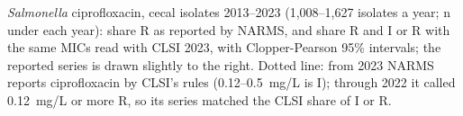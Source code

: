 \textit{Salmonella} ciprofloxacin, cecal isolates 2013--2023 (1,008--1,627 isolates a year; n under each year): share R as reported by NARMS, and share R and I or R with the same MICs read with CLSI 2023, with Clopper-Pearson 95\% intervals; the reported series is drawn slightly to the right. Dotted line: from 2023 NARMS reports ciprofloxacin by CLSI's rules (0.12--0.5~mg/L is I); through 2022 it called 0.12~mg/L or more R, so its series matched the CLSI share of I or R.

